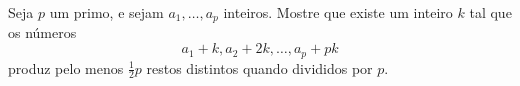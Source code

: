 Seja $p$ um primo, e sejam $a_1,\ldots,a_p$ inteiros. Mostre que existe um inteiro $k$ tal que os números \[a_1+k,a_2+2k,\ldots,a_p+pk\] produz pelo menos $\frac{1}{2}p$ restos distintos quando divididos por $p$.
